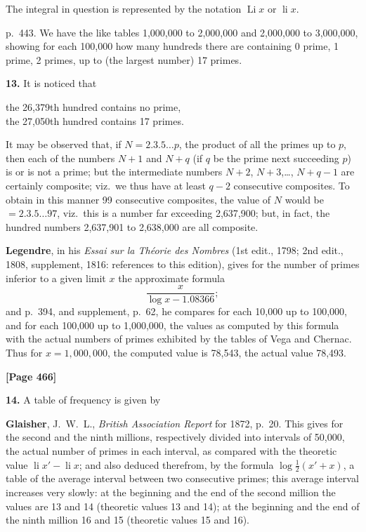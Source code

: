\documentclass[11pt,a4paper]{article}
\begin{document}
The integral in question is represented by the notation $\operatorname{Li}x$ or $\operatorname{li}x$.

p.\ 443. We have the like tables 1,000,000 to 2,000,000 and 2,000,000 to 3,000,000, showing for each 100,000 how many hundreds there are containing 0 prime, 1 prime, 2 primes, up to (the largest number) 17 primes.

\textbf{13.} It is noticed that
\begin{center}
the 26,379th hundred contains no prime,\\
the 27,050th hundred contains 17 primes.
\end{center}

It may be observed that, if $N = 2.3.5\ldots p$, the product of all the primes up to $p$, then each of the numbers $N+1$ and $N+q$ (if $q$ be the prime next succeeding $p$) is or is not a prime; but the intermediate numbers $N+2$, $N+3$,\ldots, $N+q-1$ are certainly composite; viz.\ we thus have at least $q-2$ consecutive composites. To obtain in this manner 99 consecutive composites, the value of $N$ would be $= 2.3.5\ldots 97$, viz.\ this is a number far exceeding 2,637,900; but, in fact, the hundred numbers 2,637,901 to 2,638,000 are all composite.

\textbf{Legendre}, in his \textit{Essai sur la Th\'{e}orie des Nombres} (1st edit., 1798; 2nd edit., 1808, supplement, 1816: references to this edition), gives for the number of primes inferior to a given limit $x$ the approximate formula
\[\frac{x}{\log x - 1.08366};\]
and p.\ 394, and supplement, p.\ 62, he compares for each 10,000 up to 100,000, and for each 100,000 up to 1,000,000, the values as computed by this formula with the actual numbers of primes exhibited by the tables of Vega and Chernac. Thus for $x = 1{,}000{,}000$, the computed value is 78,543, the actual value 78,493.


\newpage
\textbf{[Page 466]}

\textbf{14.} A table of frequency is given by

\quad\textbf{Glaisher}, J.\ W.\ L., \textit{British Association Report} for 1872, p.\ 20. This gives for the second and the ninth millions, respectively divided into intervals of 50,000, the actual number of primes in each interval, as compared with the theoretic value $\operatorname{li}x' - \operatorname{li}x$; and also deduced therefrom, by the formula $\log\frac{1}{2}(x'+x)$, a table of the average interval between two consecutive primes; this average interval increases very slowly: at the beginning and the end of the second million the values are 13 and 14 (theoretic values 13 and 14); at the beginning and the end of the ninth million 16 and 15 (theoretic values 15 and 16).
\end{document}

